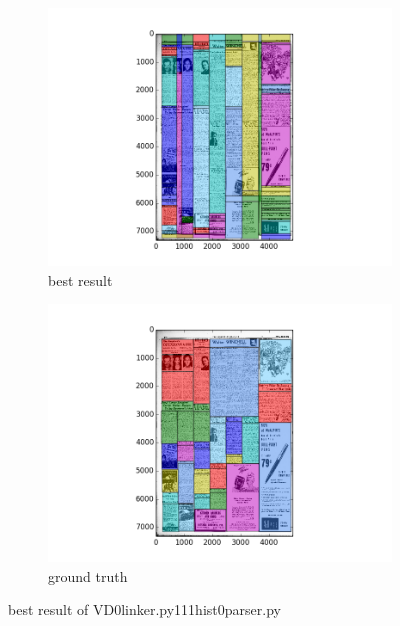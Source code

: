\documentclass[a4paper,10pt]{article}
\begin{document}
					\begin{figure}
					\centering
					\begin{subfigure}{.5\textwidth}
					  \centering
					  \includegraphics[width=10cm]
					{VD0linker.py111hist0parser.py.best.png}
					  \caption{best result}
					  \label{fig:sub1}
					\end{subfigure}%
					\begin{subfigure}{.5\textwidth}
					  \centering
					  \includegraphics[width=10cm]
					{VD0linker.py111hist0parser.py.gt.best.png}
					  \caption{ground truth}
					  \label{fig:sub2}
					\end{subfigure}
					\caption
					{best result of VD0linker.py111hist0parser.py}
					\label{fig:test}
					\end{figure}
					
\end{document}
